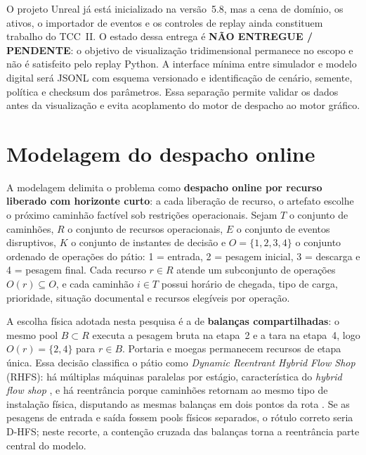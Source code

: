 \documentclass[
  12pt,
  oneside,
  a4paper,
  sumario=tradicional,
  brazil
]{abntex2}
\begin{document}
O projeto Unreal j\'a est\'a inicializado na vers\~ao~5.8, mas a cena de dom\'inio, os ativos,
o importador de eventos e os controles de replay ainda constituem trabalho do TCC~II.
O estado dessa entrega \'e \textbf{N\~AO ENTREGUE / PENDENTE}: o objetivo de visualiza\c{c}\~ao
tridimensional permanece no escopo e n\~ao \'e satisfeito pelo replay Python. A
interface m\'inima entre simulador e modelo digital ser\'a JSONL com esquema versionado e
identifica\c{c}\~ao de cen\'ario, semente, pol\'itica e checksum dos par\^ametros. Essa
separa\c{c}\~ao permite validar os dados antes da visualiza\c{c}\~ao e evita acoplamento do
motor de despacho ao motor gr\'afico.

\section{Modelagem do despacho online}\label{ch:modelagem}
A modelagem delimita o problema como \textbf{despacho online por recurso liberado com horizonte curto}: a cada libera\c{c}\~ao de recurso, o artefato escolhe o pr\'oximo caminh\~ao fact\'ivel sob restri\c{c}\~oes operacionais. Sejam $T$ o conjunto de caminh\~oes, $R$ o conjunto de recursos operacionais, $E$ o conjunto de eventos disruptivos, $K$ o conjunto de instantes de decis\~ao e $O = \{1,2,3,4\}$ o conjunto ordenado de opera\c{c}\~oes do p\'atio: 1 = entrada, 2 = pesagem inicial, 3 = descarga e 4 = pesagem final. Cada recurso $r \in R$ atende um subconjunto de opera\c{c}\~oes $O(r) \subseteq O$, e cada caminh\~ao $i \in T$ possui hor\'ario de chegada, tipo de carga, prioridade, situa\c{c}\~ao documental e recursos eleg\'iveis por opera\c{c}\~ao.

A escolha f\'isica adotada nesta pesquisa \'e a de \textbf{balan\c{c}as compartilhadas}: o mesmo pool $B \subset R$ executa a pesagem bruta na etapa~2 e a tara na etapa~4, logo $O(r)=\{2,4\}$ para $r \in B$. Portaria e moegas permanecem recursos de etapa \'unica. Essa decis\~ao classifica o p\'atio como \textit{Dynamic Reentrant Hybrid Flow Shop} (RHFS): h\'a m\'ultiplas m\'aquinas paralelas por est\'agio, caracter\'istica do \textit{hybrid flow shop} \parencite{ruizHybridFlowShop2010, ribasReviewClassificationHybrid2010}, e h\'a reentr\^ancia porque caminh\~oes retornam ao mesmo tipo de instala\c{c}\~ao f\'isica, disputando as mesmas balan\c{c}as em dois pontos da rota \parencite{gravesSchedulingReentrantFlow1983}. Se as pesagens de entrada e sa\'ida fossem pools f\'isicos separados, o r\'otulo correto seria D-HFS; neste recorte, a conten\c{c}\~ao cruzada das balan\c{c}as torna a reentr\^ancia parte central do modelo.
\end{document}
